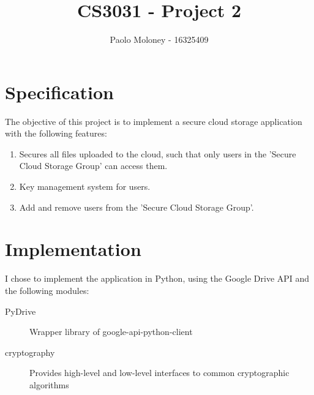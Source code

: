 \documentclass{article}
\title{CS3031 - Project 2}
\author{Paolo Moloney - 16325409}
\begin{document}
\maketitle
\newpage
\tableofcontents
\newpage
\section{Specification}
	The objective of this project is to implement a secure cloud storage application with the following features:
	\begin{enumerate}
		\item Secures all files uploaded to the cloud, such that only users in the 'Secure Cloud Storage Group' can access them.
		\item Key management system for users.
		\item Add and remove users from the 'Secure Cloud Storage Group'.
	\end{enumerate}
	\newpage
\section{Implementation}
	I chose to implement the application in Python, using the Google Drive API and the following modules:
	\begin{description}
		\item[PyDrive]
			Wrapper library of google-api-python-client
		\item[cryptography]
			Provides high-level and low-level interfaces to common cryptographic algorithms
	\end{description}
\end{document}
